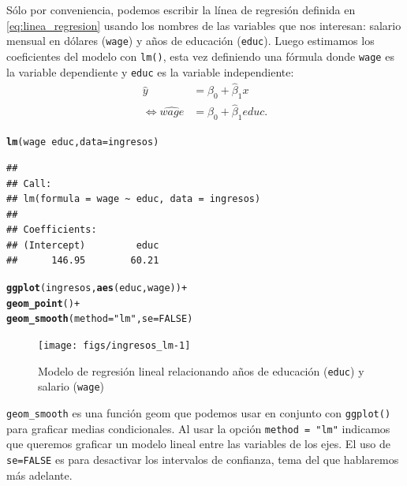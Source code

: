 \documentclass[12pt]{report}\usepackage[]{graphicx}\usepackage[]{color}
\makeatletter
\newcommand{\hlnum}[1]{\textcolor[rgb]{0.686,0.059,0.569}{#1}}%
\newcommand{\hlstr}[1]{\textcolor[rgb]{0.192,0.494,0.8}{#1}}%
\newcommand{\hlopt}[1]{\textcolor[rgb]{0,0,0}{#1}}%
\newcommand{\hlstd}[1]{\textcolor[rgb]{0.345,0.345,0.345}{#1}}%
\newcommand{\hlkwc}[1]{\textcolor[rgb]{0.333,0.667,0.333}{#1}}%
\newcommand{\hlkwd}[1]{\textcolor[rgb]{0.737,0.353,0.396}{\textbf{#1}}}%
\newenvironment{kframe}{%
 \def\at@end@of@kframe{}%
 \ifinner\ifhmode%
  \def\at@end@of@kframe{\end{minipage}}%
  \begin{minipage}{\columnwidth}%
 \fi\fi%
 \def\FrameCommand##1{\hskip\@totalleftmargin \hskip-\fboxsep
 \colorbox{shadecolor}{##1}\hskip-\fboxsep
     \hskip-\linewidth \hskip-\@totalleftmargin \hskip\columnwidth}%
 \MakeFramed {\advance\hsize-\width
   \@totalleftmargin\z@ \linewidth\hsize
   \@setminipage}}%
 {\par\unskip\endMakeFramed%
 \at@end@of@kframe}
\newenvironment{knitrout}{}{} %
\makeatother
\begin{document}
Sólo por conveniencia, podemos escribir la línea de regresión definida en \eqref{eq:linea_regresion} usando los nombres de las variables que nos interesan: salario mensual en dólares (\verb|wage|) y años de educación (\verb|educ|). Luego estimamos los coeficientes del modelo con \verb|lm()|, esta vez definiendo una fórmula donde \verb|wage| es la variable dependiente y \verb|educ| es la variable independiente:
\begin{align*}
\hat y &= \hat\beta_0 + \hat\beta_1 x \\
\Longleftrightarrow \widehat{wage} &= \hat\beta_0 + \hat\beta_1 {educ}.
\end{align*}

\begin{knitrout}
\color{fgcolor}\begin{kframe}
\begin{alltt}
\hlkwd{lm}\hlstd{(wage} \hlopt{~} \hlstd{educ,} \hlkwc{data} \hlstd{= ingresos)}
\end{alltt}
\begin{verbatim}
## 
## Call:
## lm(formula = wage ~ educ, data = ingresos)
## 
## Coefficients:
## (Intercept)         educ  
##      146.95        60.21
\end{verbatim}
\begin{alltt}
\hlkwd{ggplot}\hlstd{(ingresos,} \hlkwd{aes}\hlstd{(educ, wage))} \hlopt{+}
  \hlkwd{geom_point}\hlstd{()} \hlopt{+}
  \hlkwd{geom_smooth}\hlstd{(}\hlkwc{method} \hlstd{=} \hlstr{"lm"}\hlstd{,} \hlkwc{se} \hlstd{=} \hlnum{FALSE}\hlstd{)}
\end{alltt}
\end{kframe}\begin{figure}[htb]

{\centering \texttt{[image: figs/ingresos\_lm-1]} 

}

\caption[Modelo de regresión lineal relacionando años de educación (\texttt{educ}) y salario (\texttt{wage})]{Modelo de regresión lineal relacionando años de educación (\texttt{educ}) y salario (\texttt{wage})}\label{fig:ingresos_lm}
\end{figure}


\end{knitrout}
\begin{Rbox}
\verb|geom_smooth| es una función geom que podemos usar en conjunto con \verb|ggplot()| para graficar medias condicionales. Al usar la opción \verb|method = "lm"| indicamos que queremos graficar un modelo lineal entre las variables de los ejes. El uso de \verb|se=FALSE| es para desactivar los intervalos de confianza, tema del que hablaremos más adelante.
\end{Rbox}
\end{document}

